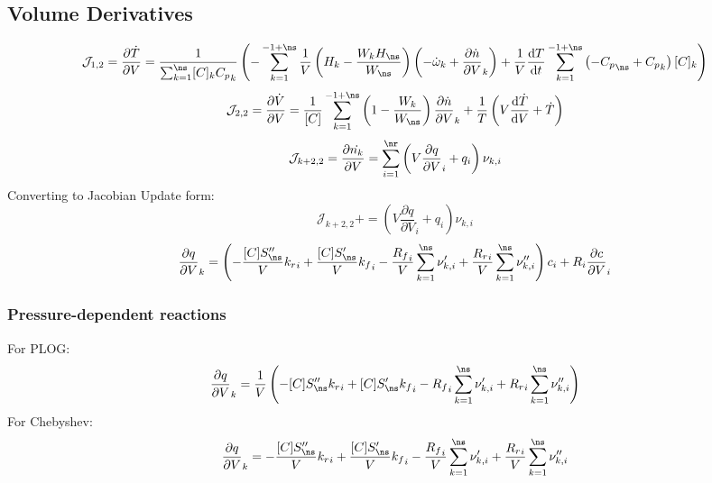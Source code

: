 \documentclass[a4paper,10pt]{article}
\newcommand{\pluseq}{\mathrel{{+}{=}}}
\begin{document}
\subsection{Volume Derivatives}
\begin{dmath} \mathcal{J}_{1,2} = \frac{\partial\dot{T}}{\partial{V}} = \frac{1}{\sum_{k=1}^{\ns} [C]_{k} {C_p}_{k}} \left(- \sum_{k=1}^{-1 + \ns} \frac{1}{V} \left(H_{k} - \frac{W_{k} H_{\ns}}{W_{\ns}}\right) \left(- \dot{\omega}_{k} + \frac{\partial \dot{n} }{\partial V }_{k}\right) + \frac{1}{V} \frac{\text{d} T }{\text{d} t } \sum_{k=1}^{-1 + \ns} \left(- {C_p}_{\ns} + {C_p}_{k}\right) [C]_{k}\right)\end{dmath} 
\begin{dmath} \mathcal{J}_{2,2} = \frac{\partial \dot{ V } }{\partial V } = \frac{1}{[C]} \sum_{k=1}^{-1 + \ns} \left(1 - \frac{W_{k}}{W_{\ns}}\right) \frac{\partial \dot{n} }{\partial V }_{k} + \frac{1}{T} \left(V \frac{\text{d} \dot{T} }{\text{d} V } + \dot{T}\right)\end{dmath} 
\begin{dmath} \mathcal{J}_{k + 2,2} = \frac{\partial \dot{n_k} }{\partial V } = \sum_{i=1}^{\nr} \left(V \frac{\partial q }{\partial V }_{i} + q_{i}\right) \nu_{k,i}\end{dmath} 
Converting to Jacobian Update form:
\begin{dmath} \mathcal{J}_{k + 2,2}\pluseq \left(V \frac{\partial q }{\partial V }_{i} + q_{i}\right) \nu_{k,i}\end{dmath} 
\begin{dmath} \frac{\partial q }{\partial V }_{k} = \left(- \frac{[C] S^{\prime\prime}_{\ns}}{V} {k_r}_{i} + \frac{[C] S^{\prime}_{\ns}}{V} {k_f}_{i} - \frac{{R_f}_{i}}{V} \sum_{k=1}^{\ns} \nu^{\prime}_{k,i} + \frac{{R_r}_{i}}{V} \sum_{k=1}^{\ns} \nu^{\prime\prime}_{k,i}\right) c_{i} + R_{i} \frac{\partial c }{\partial V }_{i}\end{dmath} 
\subsubsection{Pressure-dependent reactions}
For PLOG:
\begin{dmath} \frac{\partial q }{\partial V }_{k} = \frac{1}{V} \left(- [C] S^{\prime\prime}_{\ns} {k_r}_{i} + [C] S^{\prime}_{\ns} {k_f}_{i} - {R_f}_{i} \sum_{k=1}^{\ns} \nu^{\prime}_{k,i} + {R_r}_{i} \sum_{k=1}^{\ns} \nu^{\prime\prime}_{k,i}\right)\end{dmath} 
For Chebyshev:
\begin{dmath} \frac{\partial q }{\partial V }_{k} = - \frac{[C] S^{\prime\prime}_{\ns}}{V} {k_r}_{i} + \frac{[C] S^{\prime}_{\ns}}{V} {k_f}_{i} - \frac{{R_f}_{i}}{V} \sum_{k=1}^{\ns} \nu^{\prime}_{k,i} + \frac{{R_r}_{i}}{V} \sum_{k=1}^{\ns} \nu^{\prime\prime}_{k,i}\end{dmath} 
\end{document}

